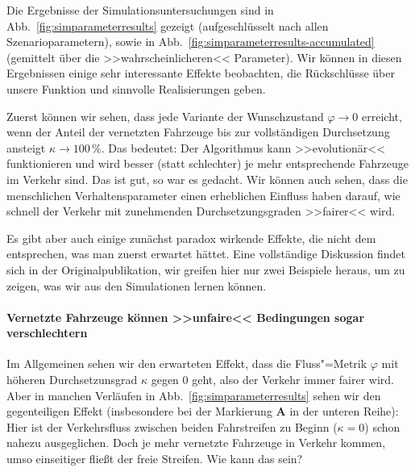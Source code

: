 Die Ergebnisse der Simulationsuntersuchungen sind in Abb.~\ref{fig:simparameterresults} gezeigt (aufgeschlüsselt nach allen Szenarioparametern), sowie in Abb.~\ref{fig:simparameterresults-accumulated} (gemittelt über die >>wahrscheinlicheren<< Parameter). Wir können in diesen Ergebnissen einige sehr interessante Effekte beobachten, die Rückschlüsse über unsere Funktion und sinnvolle Realisierungen geben.

Zuerst können wir sehen, dass jede Variante der Wunschzustand $\varphi \rightarrow 0$ erreicht, wenn der Anteil der vernetzten Fahrzeuge bis zur vollständigen Durchsetzung ansteigt $\kappa \rightarrow 100\,\%$. Das bedeutet: Der Algorithmus kann >>evolutionär<< funktionieren und wird besser (statt schlechter) je mehr entsprechende Fahrzeuge im Verkehr sind. Das ist gut, so war es gedacht. Wir können auch sehen, dass die menschlichen Verhaltensparameter einen erheblichen Einfluss haben darauf, wie schnell der Verkehr mit zunehmenden Durchsetzungsgraden >>fairer<< wird.

Es gibt aber auch einige zunächst paradox wirkende Effekte, die nicht dem entsprechen, was man zuerst erwartet hättet. Eine vollständige Diskussion findet sich in der Originalpublikation, wir greifen hier nur zwei Beispiele heraus, um zu zeigen, was wir aus den Simulationen lernen können.




\paragraph{Vernetzte Fahrzeuge können >>unfaire<< Bedingungen sogar verschlechtern}\label{sec:effect-imbalance} Im Allgemeinen sehen wir den erwarteten Effekt, dass die Fluss"=Metrik $\varphi$ mit höheren Durchsetzunsgrad $\kappa$ gegen 0 geht, also der Verkehr immer fairer wird. Aber in manchen Verläufen in Abb.~\ref{fig:simparameterresults} sehen wir den gegenteiligen Effekt (insbesondere bei der Markierung \textbf{A} in der unteren Reihe): Hier ist der Verkehrsfluss zwischen beiden Fahrstreifen zu Beginn ($\kappa=0$) schon nahezu ausgeglichen. Doch je mehr vernetzte Fahrzeuge in Verkehr kommen, umso einseitiger fließt der freie Streifen. Wie kann das sein?


